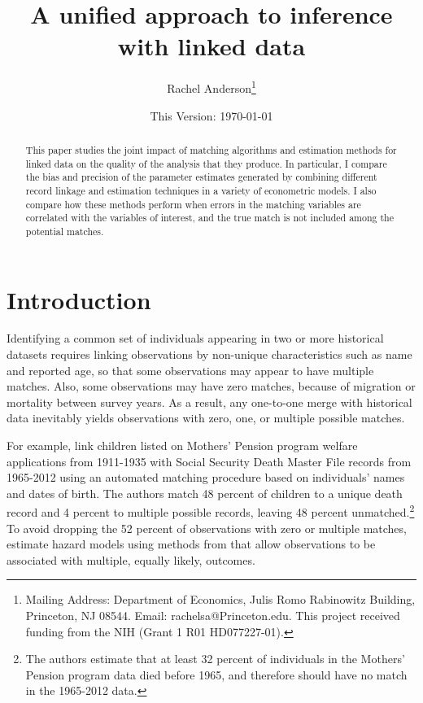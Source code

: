 \documentclass[12pt]{article}
\title{\singlespacing A unified approach to inference with linked data}
\author{Rachel Anderson\thanks{Mailing Address: Department of Economics, Julis Romo Rabinowitz Building,
Princeton, NJ 08544. Email: rachelsa@Princeton.edu.
This project received funding from the NIH (Grant 1 R01 HD077227-01). }}
\date{This Version: \today}
\begin{document}
\maketitle


\begin{abstract}
\singlespacing
\noindent This paper studies the joint impact of matching algorithms and estimation methods for linked data on the quality of the analysis that they produce.  In particular, I compare the bias and precision of the parameter estimates generated by combining different record linkage and estimation techniques in a variety of econometric models.  I also compare how these methods perform when errors in the matching variables are correlated with the variables of interest, and the true match is not included among the potential matches.  \end{abstract}


\section{Introduction}

Identifying a common set of individuals appearing in two or more historical datasets requires linking observations by non-unique characteristics such as name and reported age, so that some observations may appear to have multiple matches.  Also, some observations may have zero matches, because of migration or mortality between survey years.  As a result, any one-to-one merge with historical data inevitably yields observations with zero, one, or multiple possible matches.  

For example, \cite{aizer2016} link children listed on Mothers' Pension program welfare applications from 1911-1935 with Social Security Death Master File records from 1965-2012 using an automated matching procedure based on individuals' names and dates of birth.  The authors match 48 percent of children to a unique death record and 4 percent to multiple possible records, leaving 48 percent unmatched.\footnote{The authors estimate that at least 32 percent of individuals in the Mothers' Pension program data died before 1965, and therefore should have no match in the 1965-2012 data.}  To avoid dropping the 52 percent of observations with zero or multiple matches, \cite{aizer2016} estimate hazard models using methods from \cite{ahl2019} that allow observations to be associated with multiple, equally likely, outcomes.  
\end{document}
